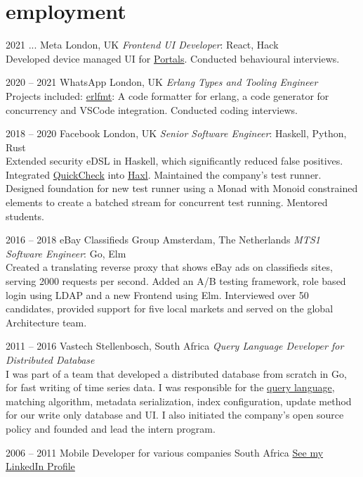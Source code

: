 \documentclass[print]{friggeri-cv-a4} %
\begin{document}
\section{employment}
\begin{entrylist}

\entry
{2021 ...}
{Meta}
{London, UK}
{\emph{Frontend UI Developer}: React, Hack \\
Developed device managed UI for \href{https://portal.facebook.com/business/}{Portals}. Conducted behavioural interviews.
}

\entry
{2020 -- 2021}
{WhatsApp}
{London, UK}
{\emph{Erlang Types and Tooling Engineer} \\
Projects included: \href{https://github.com/whatsapp/erlfmt}{erlfmt}: A code formatter for erlang, a code generator for concurrency and VSCode integration. Conducted coding interviews.
}

\entry
{2018 -- 2020}
{Facebook}
{London, UK}
{\emph{Senior Software Engineer}: Haskell, Python, Rust \\
Extended security eDSL in Haskell, which significantly reduced false positives. Integrated \href{https://hackage.haskell.org/package/QuickCheck}{QuickCheck} into \href{https://github.com/facebook/Haxl}{Haxl}.
Maintained the company's test runner. Designed foundation for new test runner using a Monad with Monoid constrained elements to create a batched stream for concurrent test running.  Mentored students.
}

\entry
{2016 -- 2018}
{eBay Classifieds Group}
{Amsterdam, The Netherlands}
{\emph{MTS1 Software Engineer}: Go, Elm \\
Created a translating reverse proxy that shows eBay ads on classifieds sites, serving 2000 requests per second. Added an A/B testing framework, role based login using LDAP and a new Frontend using Elm. Interviewed over 50 candidates, provided support for five local markets and served on the global Architecture team.
}

\entry
{2011 -- 2016}
{Vastech}
{Stellenbosch, South Africa}
{\emph{Query Language Developer for Distributed Database} \\
I was part of a team that developed a distributed database from scratch in Go, for fast writing of time series data. I was responsible for the \href{https://github.com/katydid/katydid}{query language}, matching algorithm, metadata serialization, index configuration, update method for our write only database and UI. I also initiated the company's open source policy and founded and lead the intern program.
}

\entry
{2006 -- 2011}
{Mobile Developer for various companies}
{South Africa}
{\href{https://za.linkedin.com/in/schulzewalter}{See my LinkedIn Profile}}

\end{entrylist}
\end{document}
